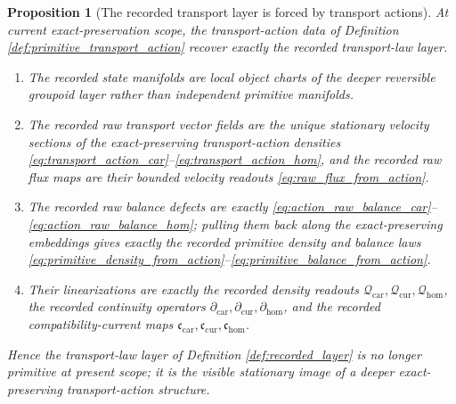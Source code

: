 \documentclass[11pt]{article}
\newcommand{\TensorCurrent}{\mathfrak c_{\mathrm{car}}}
\newcommand{\CurCurrent}{\mathfrak c_{\mathrm{cur}}}
\newcommand{\HomCurrent}{\mathfrak c_{\mathrm{hom}}}
\newcommand{\TensorDensity}{\mathcal Q_{\mathrm{car}}}
\newcommand{\CurDensity}{\mathcal Q_{\mathrm{cur}}}
\newcommand{\HomDensity}{\mathcal Q_{\mathrm{hom}}}
\newcommand{\TensorCont}{\partial_{\mathrm{car}}}
\newcommand{\CurCont}{\partial_{\mathrm{cur}}}
\newcommand{\HomCont}{\partial_{\mathrm{hom}}}
\newtheorem{proposition}{Proposition}
\begin{document}
\begin{proposition}[The recorded transport layer is forced by transport actions]
\label{prop:transport_from_action}
At current exact-preservation scope, the transport-action data of Definition \ref{def:primitive_transport_action} recover exactly the recorded transport-law layer.
\begin{enumerate}
    \item The recorded state manifolds are local object charts of the deeper reversible groupoid layer rather than independent primitive manifolds.
    \item The recorded raw transport vector fields are the unique stationary velocity sections of the exact-preserving transport-action densities \eqref{eq:transport_action_car}--\eqref{eq:transport_action_hom}, and the recorded raw flux maps are their bounded velocity readouts \eqref{eq:raw_flux_from_action}.
    \item The recorded raw balance defects are exactly \eqref{eq:action_raw_balance_car}--\eqref{eq:action_raw_balance_hom}; pulling them back along the exact-preserving embeddings gives exactly the recorded primitive density and balance laws \eqref{eq:primitive_density_from_action}--\eqref{eq:primitive_balance_from_action}.
    \item Their linearizations are exactly the recorded density readouts \(\TensorDensity,\CurDensity,\HomDensity\), the recorded continuity operators \(\TensorCont,\CurCont,\HomCont\), and the recorded compatibility-current maps \(\TensorCurrent,\CurCurrent,\HomCurrent\).
\end{enumerate}
Hence the transport-law layer of Definition \ref{def:recorded_layer} is no longer primitive at present scope; it is the visible stationary image of a deeper exact-preserving transport-action structure.
\end{proposition}
\end{document}
